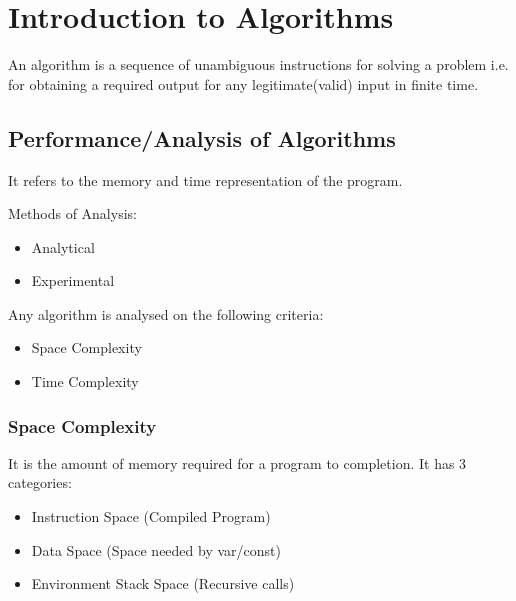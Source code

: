\documentclass[./AlgorithmDesign.tex]{subfiles}
\begin{document}
\section[Introduction]{Introduction to Algorithms}
An algorithm is a sequence of unambiguous instructions for solving a problem i.e. for obtaining a required output
for any legitimate(valid) input in finite time.

\subsection{Performance/Analysis of Algorithms}
It refers to the memory and time representation of the program.

Methods of Analysis: 
\begin{itemize}
\item Analytical
\item Experimental
\end{itemize}

Any algorithm is analysed on the following criteria:
\begin{itemize}
\item Space Complexity
\item Time Complexity
\end{itemize}

\subsubsection{Space Complexity}
It is the amount of memory required for a program to completion.
It has 3 categories:

\begin{itemize}
\item Instruction Space (Compiled Program)
\item Data Space (Space needed by var/const)
\item Environment Stack Space (Recursive calls)
\end{itemize}


\newpage
\end{document}
